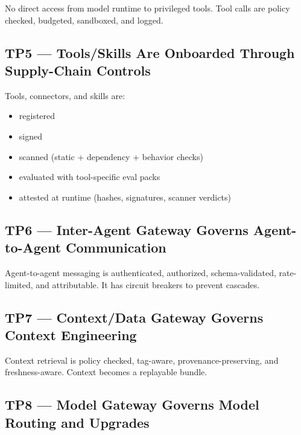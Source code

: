 \documentclass[11pt]{article}
\begin{document}
No direct access from model runtime to privileged tools. Tool calls are
policy checked, budgeted, sandboxed, and logged.

\hypertarget{tp5-toolsskills-are-onboarded-through-supply-chain-controls}{%
\subsection{TP5 --- Tools/Skills Are Onboarded Through Supply-Chain Controls}\label{tp5-toolsskills-are-onboarded-through-supply-chain-controls}}

Tools, connectors, and skills are:

\begin{itemize}
\tightlist
\item
  registered
\item
  signed
\item
  scanned (static + dependency + behavior checks)
\item
  evaluated with tool-specific eval packs
\item
  attested at runtime (hashes, signatures, scanner verdicts)
\end{itemize}

\hypertarget{tp6-inter-agent-gateway-governs-agent-to-agent-communication}{%
\subsection{TP6 --- Inter-Agent Gateway Governs Agent-to-Agent Communication}\label{tp6-inter-agent-gateway-governs-agent-to-agent-communication}}

Agent-to-agent messaging is authenticated, authorized, schema-validated,
rate-limited, and attributable. It has circuit breakers to prevent
cascades.

\hypertarget{tp7-contextdata-gateway-governs-context-engineering}{%
\subsection{TP7 --- Context/Data Gateway Governs Context Engineering}\label{tp7-contextdata-gateway-governs-context-engineering}}

Context retrieval is policy checked, tag-aware, provenance-preserving,
and freshness-aware. Context becomes a replayable bundle.

\hypertarget{tp8-model-gateway-governs-model-routing-and-upgrades}{%
\subsection{TP8 --- Model Gateway Governs Model Routing and Upgrades}\label{tp8-model-gateway-governs-model-routing-and-upgrades}}
\end{document}
